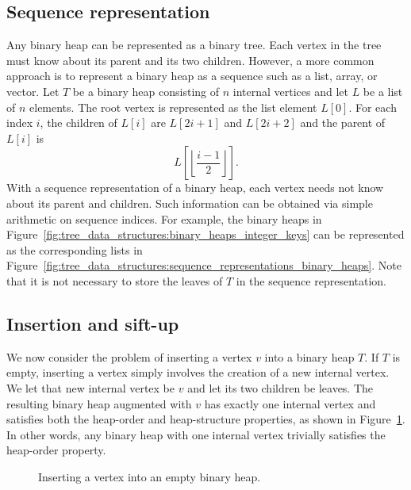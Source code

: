 
\subsection{Sequence representation}

Any binary heap can be represented as a binary tree. Each vertex in
the tree must know about its parent and its two children. However, a
more common approach is to represent a binary heap as a sequence such
as a list, array, or vector. Let $T$ be a binary heap consisting of
$n$ internal vertices and let $L$ be a list of $n$ elements. The root
vertex is represented as the list element $L[0]$. For each index $i$,
the children of $L[i]$ are $L[2i + 1]$ and $L[2i + 2]$ and the parent
of $L[i]$ is
\[
L\left[ \left\lfloor \frac{i - 1}{2} \right\rfloor \right].
\]
With a sequence representation of a binary heap, each vertex needs not
know about its parent and children. Such information can be obtained
via simple arithmetic on sequence indices. For example, the binary
heaps in
Figure~\ref{fig:tree_data_structures:binary_heaps_integer_keys} can be
represented as the corresponding lists in
Figure~\ref{fig:tree_data_structures:sequence_representations_binary_heaps}.
Note that it is not necessary to store the leaves of $T$ in the
sequence representation.



\subsection{Insertion and sift-up}
\label{subsec:tree_data_structures:insertion_sift_up}

We now consider the problem of inserting a vertex $v$ into a binary
heap $T$. If $T$ is empty, inserting a vertex simply involves the
creation of a new internal vertex. We let that new internal vertex be
$v$ and let its two children be leaves. The resulting binary heap
augmented with $v$ has exactly one internal vertex and satisfies both
the heap-order and heap-structure properties, as shown in
Figure~\ref{fig:tree_data_structures:insert_vertex_into_empty_binary_heap}.
In other words, any binary heap with one internal vertex trivially
satisfies the heap-order property.

\begin{figure}[!htbp]
\centering
{}
\qquad
{}
\caption{Inserting a vertex into an empty binary heap.}
\label{fig:tree_data_structures:insert_vertex_into_empty_binary_heap}
\end{figure}

